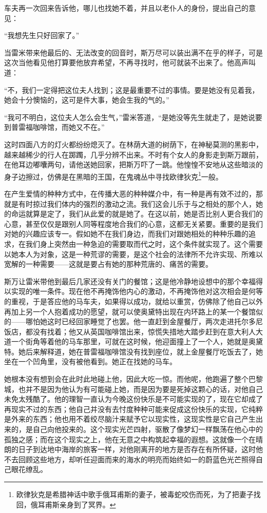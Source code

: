 \par 车夫再一次回来告诉他，哪儿也找她不着，并且以老仆人的身份，提出自己的意见：
\par “我想先生只好回家了。”
\par 当雷米带来他最后的、无法改变的回音时，斯万尽可以装出满不在乎的样子，可是这次当他看见他打算要他放弃希望，不再寻找时，他可就装不出来了。他高声叫道：
\par “不，我们一定得把这位夫人找到；这是最重要不过的事情。要是她没有见着我，她会十分懊恼的，这可是件大事，她会生我的气的。”
\par “我可不明白，这位夫人怎么会生气，”雷米答道，“是她没等先生就走了，是她说要到普雷福咖啡馆，而她又不在。”
\par 这时四面八方的灯火都纷纷熄灭了。在林荫大道的树荫下，在神秘莫测的黑影中，越来越稀少的行人在踯躅，几乎分辨不出来。不时有个女人的身影走到斯万跟前，在他耳边嘟囔两句，请他送她回家，把斯万吓了一跳。他惶惶不安地从这些暗淡的身子边擦过，仿佛是在黑暗的王国，在鬼魂丛中寻找欧律狄克\footnote{欧律狄克是希腊神话中歌手俄耳甫斯的妻子，被毒蛇咬伤而死，为了把妻子找回，俄耳甫斯亲身到了冥界。}一般。
\par 在产生爱情的种种方式中，在传播大恶的种种媒介中，有一种是再有效不过的，那就是有时掠过我们体内的强烈的激动之流。我们这会儿乐于与之相处的那个人，她的命运就算是定了，我们从此爱的就是她了。在这以前，她是否比别人更合我们的心意，甚至仅仅是跟别人同等程度地合我们的心意，这都无关紧要。重要的是我们对她的兴趣应该专一。假如她不在我们身边，而我们对跟她相处的种种乐趣的追求，在我们身上突然由一种急迫的需要取而代之时，这个条件就实现了。这个需要以她本人为对象，这是一种荒谬的需要，是这个社会的法律所不允许实现、所难以宽解的一种需要——这就是要占有她的那种荒唐的、痛苦的需要。
\par 斯万让雷米带他到最后几家还没有关门的餐馆；这是他冷静地设想中的那个幸福得以实现的唯一条件。现在他不再掩饰他内心的激动，不再掩饰他对这次相会是何等的重视，于是答应他的马车夫，如果得以成功，就给以重赏，仿佛除了他自己以外再加上另一个人抱着成功的愿望，就可以使奥黛特出现在内环路上的某一个餐馆似的——哪怕她这时已经回家睡觉了也罢。他一直赶到金屋餐厅，两次走进托尔多尼饭店，都没有找着；他又从英国咖啡馆出来，惊慌失措地大踏步赶到在意大利人大道一个街角等着他的马车那里，可就在这时候，他迎面撞上了一个人，她就是奥黛特。她后来解释道，她在普雷福咖啡馆没有找到座位，就上金屋餐厅吃饭去了，她坐在一个凹角里，没有被他看到。她正在找她的马车。
\par 她根本没有想到会在此时此地碰上他，因此大吃一惊。而他呢，他跑遍了整个巴黎城，也并不是因为他认为有可能碰上她，而是因为要是死掉这颗心的话，对他自己未免太残酷了。他的理智一直认为今晚这份快乐是不可能实现的了，现在它却成了再现实不过的东西；他自己并没有去忖度种种可能来促成这份快乐的实现，它纯粹是外来的东西；他也用不着绞尽脑汁来赋予它以现实性，这现实性是它自己产生出来的，是自己向他投来的。这个现实光芒四射，驱散了像梦幻一样飘荡在他心中的孤独之感；而在这个现实之上，他在无意之中构筑起幸福的遐想。这就像一个在晴朗的日子到达地中海岸的旅客一样，对他刚离开的地方是否存在有所怀疑，这时他不去回顾这些地方，却听任迎面而来的海水的明亮而始终如一的蔚蓝色光芒照得自己眼花缭乱。
